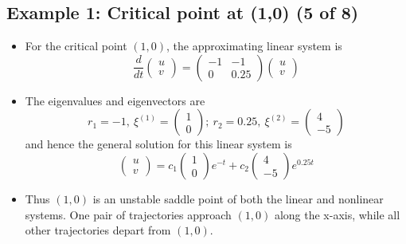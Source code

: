 \documentclass[11pt,a4paper]{article}
\begin{document}
	\subsection*{Example 1: Critical point at (1,0) (5 of 8)}
	\begin{itemize}
		\item For the critical point $(1,0)$, the approximating linear system is
		$$
		\frac{d}{dt}
		\begin{pmatrix}
			u\\
			v
		\end{pmatrix}=
		\begin{pmatrix}
			-1 & -1\\
			0 & 0.25
		\end{pmatrix}
		\begin{pmatrix}
			u\\
			v
		\end{pmatrix}
		$$
		\item The eigenvalues and eigenvectors are
		$$
		r_1 = -1,\ \xi^{(1)}=
		\begin{pmatrix}
			1\\
			0
		\end{pmatrix};\ 
		r_2 = 0.25,\ \xi^{(2)} =
		\begin{pmatrix}
			4\\
			-5
		\end{pmatrix}
		$$
		and hence the general solution for this linear system is
		$$
		\begin{pmatrix}
			u\\
			v
		\end{pmatrix} = c_1
		\begin{pmatrix}
			1\\
			0
		\end{pmatrix}e^{-t} + c_2
		\begin{pmatrix}
			4\\
			-5
		\end{pmatrix}e^{0.25t}
		$$
		\item Thus $(1,0)$ is an unstable saddle point of both the linear and nonlinear systems. One pair of trajectories approach $(1,0)$ along the x-axis, while all other trajectories depart from $(1,0)$.
	\end{itemize}
\end{document}
